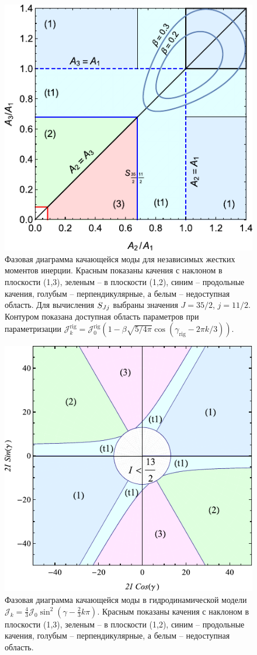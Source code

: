 \documentclass[a4paper, 10pt, twocolumn]{article}
\begin{document}
\begin{figure}%
	\centering
	\includegraphics[width=.8\linewidth]{figures/wobb-phase-independent}
	\caption{Фазовая диаграмма качающейся моды для независимых жестких 
	моментов инерции. Красным показаны качения с наклоном в плоскости 
	(1,3), зеленым -- в плоскости (1,2), синим -- продольные качения, 
	голубым -- перпендикулярные, а белым -- недоступная область. Для 
	вычисления $S_{Jj}$ выбраны значения $J = 35/2$, $j = 11/2$. Контуром 
	показана доступная область параметров при параметризации 
	$\mathcal{J}_k^\mathrm{rig} = \mathcal{J}_0^\mathrm{rig} \left(1 
	- \beta\sqrt{5/4\pi}\cos(\gamma_\mathrm{rig} - 2\pi k /3)\right)$.}
	\label{fig:independent}
\end{figure}%
\begin{figure}%
	\centering
	\includegraphics[width=.8\linewidth]{figures/wobb-phase-hydrodynamic}
	\caption{Фазовая диаграмма качающейся моды в гидродинамической модели 
	$\mathcal{J}_k = \tfrac{4}{3} \mathcal{J}_0 \sin^2(\gamma 
	- \tfrac{2}{3}k\pi) $. Красным показаны качения с наклоном в плоскости 
	(1,3), зеленым -- в плоскости (1,2), синим -- продольные качения, 
	голубым -- перпендикулярные, а белым -- недоступная область.}
	\label{fig:hydrodyn}
\end{figure}%
\end{document}
